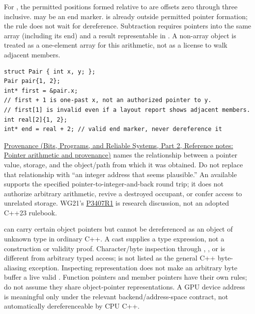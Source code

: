 For , the permitted positions formed relative to  are offsets zero through three inclusive.  may be an end marker.  is already outside permitted pointer formation; the rule does not wait for dereference. Subtraction requires pointers into the same array (including its end) and a result representable in . A non-array object is treated as a one-element array for this arithmetic, not as a license to walk adjacent members.

\begin{verbatim}
struct Pair { int x, y; };
Pair pair{1, 2};
int* first = &pair.x;
// first + 1 is one-past x, not an authorized pointer to y.
// first[1] is invalid even if a layout report shows adjacent members.
int real[2]{1, 2};
int* end = real + 2; // valid end marker, never dereference it
\end{verbatim}

\href{../01-Bits-Programs-and-Reliable-Systems-P02/main.pdf\#nameddest=appendix-6af5921bc853}{Provenance (Bits, Programs, and Reliable Systems, Part 2, Reference notes: Pointer arithmetic and provenance)} names the relationship between a pointer value, storage, and the object/path from which it was obtained. Do not replace that relationship with ``an integer address that seems plausible.'' An available  supports the specified pointer-to-integer-and-back round trip; it does not authorize arbitrary arithmetic, revive a destroyed occupant, or confer access to unrelated storage. WG21's \href{https://www.open-std.org/jtc1/sc22/wg21/docs/papers/2025/p3407r1.html}{P3407R1} is research discussion, not an adopted C++23 rulebook.

 can carry certain object pointers but cannot be dereferenced as an object of unknown type in ordinary C++. A cast supplies a type expression, not a construction or validity proof. Character/byte inspection through , , or  is different from arbitrary typed access;  is not listed as the general C++ byte-aliasing exception. Inspecting representation does not make an arbitrary byte buffer a live valid . Function pointers and member pointers have their own rules; do not assume they share object-pointer representations. A GPU device address is meaningful only under the relevant backend/address-space contract, not automatically dereferenceable by CPU C++.

